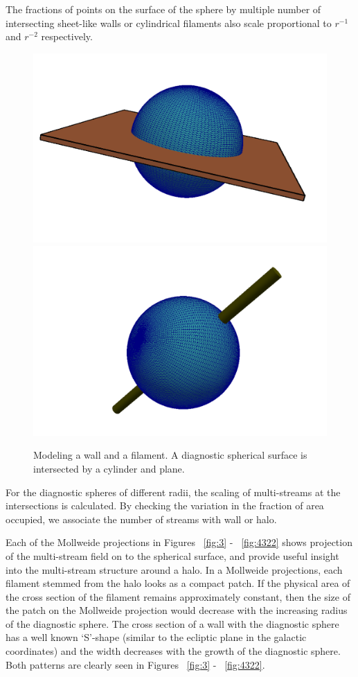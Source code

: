The fractions of points on the surface of the sphere by multiple number of intersecting sheet-like walls or cylindrical filaments also scale proportional to $ r^{-1}$ and $ r^{-2}$ respectively. 

\begin{figure}
\begin{minipage}[t]{.99\linewidth}
 \centering\includegraphics[width=10.cm]{Chapter3/Source_v2/fig6a} 
  \centering\includegraphics[width=10.cm]{Chapter3/Source_v2/fig6b}
\end{minipage}\hfill
\caption{Modeling a wall and a filament. A diagnostic spherical surface is intersected by a cylinder and plane.}
\label{fig:model}
\end{figure}


For the diagnostic spheres of different radii, the  scaling of multi-streams at the intersections is calculated. By checking the 
variation in the fraction of area occupied, we associate the number of streams with wall or halo. 

Each of the Mollweide projections in Figures ~\ref{fig:3} - ~\ref{fig:4322} shows projection of the multi-stream field on to the 
spherical surface, and provide useful insight into the multi-stream structure around a halo. %
In a Mollweide projections, each filament stemmed from the halo looks as a compact patch. If the physical area of the cross 
section of the filament remains approximately constant, then the size of the patch on the Mollweide projection would decrease with the increasing radius of the diagnostic sphere. The cross section of a wall with the diagnostic sphere has a well known
`S'-shape (similar to the ecliptic plane in the galactic coordinates) and the width decreases with the growth of the diagnostic sphere. Both patterns are clearly seen in  Figures ~\ref{fig:3} - ~\ref{fig:4322}.



